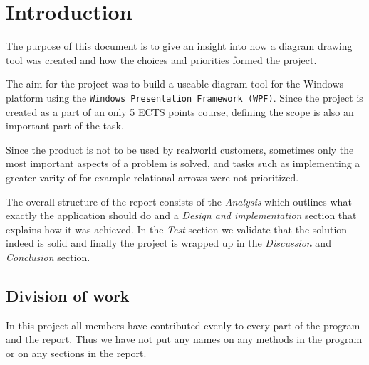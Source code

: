 \section{Introduction}
The purpose of this document is to give an insight into how a diagram drawing
tool was created and how the choices and priorities formed the project. 

The aim for the project was to build a useable diagram tool for the Windows
platform using the \texttt{Windows Presentation Framework (WPF)}. Since the project is
created as a part of an only 5 ECTS points course, defining the scope is also an
important part of the task.

Since the product is not to be used by realworld customers, sometimes only the
most important aspects of a problem is solved, and tasks such as implementing a
greater varity of for
example relational arrows were not prioritized.

The overall structure of the report consists of the
\textit{Analysis} which outlines what exactly the application should do and a
\textit{Design and implementation} section that explains how it was achieved. In the \textit{Test} section
we validate that the solution indeed is solid and finally the project is wrapped
up in the \textit{Discussion} and \textit{Conclusion} section.

\subsection{Division of work}
In this project all members have contributed evenly to every part of the 
program and the report. Thus we have not put any names on any methods in the 
program or on any sections in the report.
